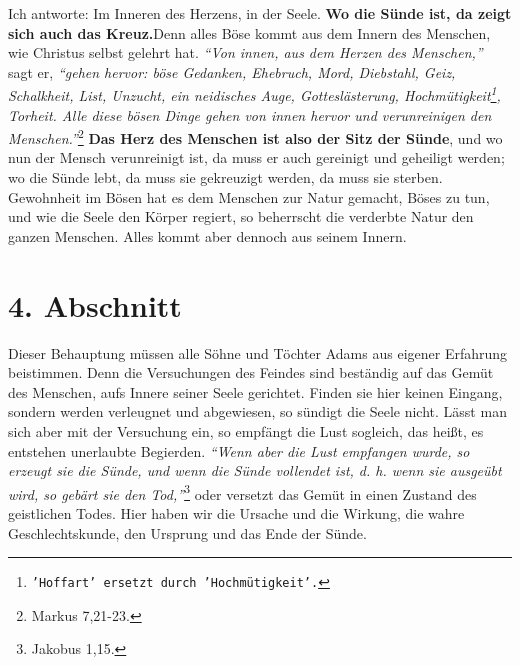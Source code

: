 \label{ref:03_03_ort_des_kreuzes}
Ich antworte: Im Inneren des Herzens, in der Seele. \textbf{Wo die Sünde ist,
da zeigt
sich auch das Kreuz.}Denn alles Böse kommt aus dem Innern des Menschen, wie
Christus selbst gelehrt hat.
\textit{"`Von innen, aus dem Herzen des Menschen,"'} sagt er,
\textit{"`gehen hervor: böse Gedanken, Ehebruch, Mord, Diebstahl, Geiz,
Schalkheit,
List, Unzucht, ein neidisches Auge, Gotteslästerung,
Hochmütigkeit\footnote{\texttt{'Hoffart' ersetzt durch 'Hochmütigkeit'.}},
Torheit. Alle
diese bösen Dinge gehen von innen hervor und verunreinigen den
Menschen."'}\footnote{Markus 7,21-23.}
\textbf{Das Herz des Menschen ist also der Sitz der Sünde},
 und wo nun der Mensch
verunreinigt ist, da muss er auch gereinigt und
geheiligt werden; wo die Sünde lebt, da muss sie gekreuzigt werden, da muss sie
sterben. Gewohnheit im Bösen hat es dem Menschen zur Natur gemacht, Böses zu
tun, und wie die Seele den Körper regiert, so beherrscht die verderbte Natur
den ganzen Menschen. Alles kommt aber dennoch aus seinem Innern.

\section{4. Abschnitt} \label{kap3_ab4}

Dieser Behauptung müssen alle Söhne und Töchter Adams aus eigener Erfahrung
beistimmen. Denn die Versuchungen des Feindes sind beständig auf das Gemüt des
Menschen, aufs Innere seiner Seele gerichtet. Finden sie hier keinen Eingang,
sondern werden verleugnet und abgewiesen, so sündigt die Seele nicht. Lässt man
sich aber mit der Versuchung ein, so empfängt die Lust sogleich, das heißt, es
entstehen unerlaubte Begierden.
\textit{"`Wenn aber die Lust empfangen wurde, so erzeugt
sie die Sünde, und wenn die Sünde vollendet ist, d. h. wenn sie ausgeübt wird,
so gebärt sie den Tod,"'}\footnote{Jakobus 1,15.}
oder versetzt das Gemüt in einen
Zustand des geistlichen Todes. Hier haben wir die
Ursache und die Wirkung, die
wahre Geschlechtskunde, den Ursprung und das Ende der Sünde.

\medskip

